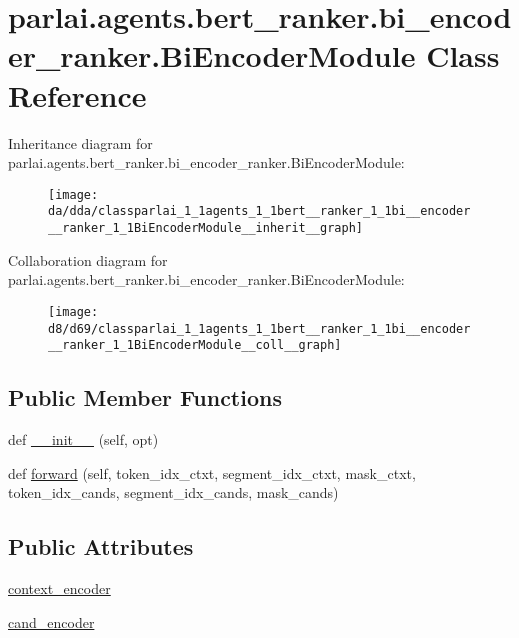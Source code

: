 \hypertarget{classparlai_1_1agents_1_1bert__ranker_1_1bi__encoder__ranker_1_1BiEncoderModule}{}\section{parlai.\+agents.\+bert\+\_\+ranker.\+bi\+\_\+encoder\+\_\+ranker.\+Bi\+Encoder\+Module Class Reference}
\label{classparlai_1_1agents_1_1bert__ranker_1_1bi__encoder__ranker_1_1BiEncoderModule}


Inheritance diagram for parlai.\+agents.\+bert\+\_\+ranker.\+bi\+\_\+encoder\+\_\+ranker.\+Bi\+Encoder\+Module\+:
\nopagebreak
\begin{figure}[H]
\begin{center}
\leavevmode
\texttt{[image: da/dda/classparlai\_1\_1agents\_1\_1bert\_\_ranker\_1\_1bi\_\_encoder\_\_ranker\_1\_1BiEncoderModule\_\_inherit\_\_graph]}
\end{center}
\end{figure}


Collaboration diagram for parlai.\+agents.\+bert\+\_\+ranker.\+bi\+\_\+encoder\+\_\+ranker.\+Bi\+Encoder\+Module\+:
\nopagebreak
\begin{figure}[H]
\begin{center}
\leavevmode
\texttt{[image: d8/d69/classparlai\_1\_1agents\_1\_1bert\_\_ranker\_1\_1bi\_\_encoder\_\_ranker\_1\_1BiEncoderModule\_\_coll\_\_graph]}
\end{center}
\end{figure}
\subsection*{Public Member Functions}
\begin{DoxyCompactItemize}
\item 
def \hyperlink{classparlai_1_1agents_1_1bert__ranker_1_1bi__encoder__ranker_1_1BiEncoderModule_a81f376495538cf4d413cd9b63184d045}{\+\_\+\+\_\+init\+\_\+\+\_\+} (self, opt)
\item 
def \hyperlink{classparlai_1_1agents_1_1bert__ranker_1_1bi__encoder__ranker_1_1BiEncoderModule_a74b6c842e6e99d8a86f669e385ae48e9}{forward} (self, token\+\_\+idx\+\_\+ctxt, segment\+\_\+idx\+\_\+ctxt, mask\+\_\+ctxt, token\+\_\+idx\+\_\+cands, segment\+\_\+idx\+\_\+cands, mask\+\_\+cands)
\end{DoxyCompactItemize}
\subsection*{Public Attributes}
\begin{DoxyCompactItemize}
\item 
\hyperlink{classparlai_1_1agents_1_1bert__ranker_1_1bi__encoder__ranker_1_1BiEncoderModule_aa92bf5d244fe4f11ea2211353d7aad6f}{context\+\_\+encoder}
\item 
\hyperlink{classparlai_1_1agents_1_1bert__ranker_1_1bi__encoder__ranker_1_1BiEncoderModule_a719af14e2b84f3a52eec12b94ff0c35f}{cand\+\_\+encoder}
\end{DoxyCompactItemize}


